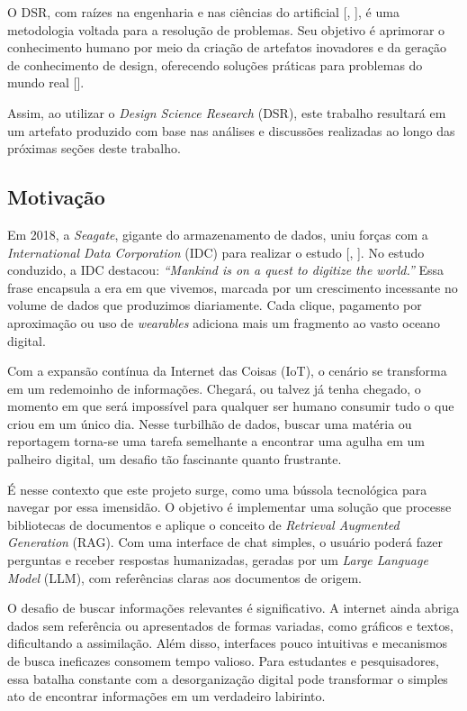 \documentclass[a4paper, 12pt]{article}
\begin{document}
    O DSR, com raízes na engenharia e nas ciências do artificial [\citeauthor{simon_1996}, \citeyear{simon_1996}], é uma metodologia voltada para a resolução de problemas. Seu objetivo é aprimorar o conhecimento humano por meio da criação de artefatos inovadores e da geração de conhecimento de design, oferecendo soluções práticas para problemas do mundo real [\textcite{design_science}].

    Assim, ao utilizar o \textit{Design Science Research} (DSR), este trabalho resultará em um artefato produzido com base nas análises e discussões realizadas ao longo das próximas seções deste trabalho.

    \subsection{Motivação}

    Em 2018, a \textit{Seagate}, gigante do armazenamento de dados, uniu forças com a \textit{International Data Corporation} (IDC) para realizar o estudo  [\citeauthor{digitization}, \citeyear{digitization}]. No estudo conduzido, a IDC destacou: \textit{“Mankind is on a quest to digitize the world.”} Essa frase encapsula a era em que vivemos, marcada por um crescimento incessante no volume de dados que produzimos diariamente. Cada clique, pagamento por aproximação ou uso de \textit{wearables} adiciona mais um fragmento ao vasto oceano digital.

    Com a expansão contínua da Internet das Coisas (IoT), o cenário se transforma em um redemoinho de informações. Chegará, ou talvez já tenha chegado, o momento em que será impossível para qualquer ser humano consumir tudo o que criou em um único dia. Nesse turbilhão de dados, buscar uma matéria ou reportagem torna-se uma tarefa semelhante a encontrar uma agulha em um palheiro digital, um desafio tão fascinante quanto frustrante.

    É nesse contexto que este projeto surge, como uma bússola tecnológica para navegar por essa imensidão. O objetivo é implementar uma solução que processe bibliotecas de documentos e aplique o conceito de \textit{Retrieval Augmented Generation} (RAG). Com uma interface de chat simples, o usuário poderá fazer perguntas e receber respostas humanizadas, geradas por um \textit{Large Language Model} (LLM), com referências claras aos documentos de origem.

    O desafio de buscar informações relevantes é significativo. A internet ainda abriga dados sem referência ou apresentados de formas variadas, como gráficos e textos, dificultando a assimilação. Além disso, interfaces pouco intuitivas e mecanismos de busca ineficazes consomem tempo valioso. Para estudantes e pesquisadores, essa batalha constante com a desorganização digital pode transformar o simples ato de encontrar informações em um verdadeiro labirinto.
\end{document}
